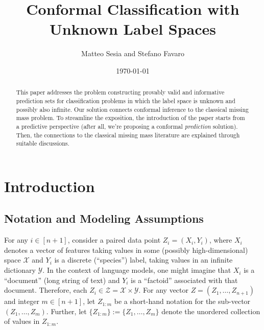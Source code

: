 \documentclass[11pt]{article}
\title{Conformal Classification with Unknown Label Spaces}
\author{Matteo Sesia and Stefano Favaro}
\date{\today}
\begin{document}
\maketitle

\begin{abstract}
  This paper addresses the problem constructing provably valid and informative prediction sets for classification problems in which the label space is unknown and possibly also infinite. Our solution connects conformal inference to the classical missing mass problem. To streamline the exposition, the introduction of the paper starts from a predictive perspective (after all, we're proposing a conformal {\em prediction} solution). Then, the connections to the classical missing mass literature are explained through suitable discussions.
\end{abstract}

\section{Introduction}

\subsection{Notation and Modeling Assumptions}

For any $i \in [n+1]$, consider a paired data point $Z_i=(X_i, Y_i)$, where $X_i$ denotes a vector of features taking values in some (possibly high-dimensional) space $\mathcal{X}$ and $Y_i$ is a discrete (``species'') label, taking values in an infinite dictionary $\mathcal{Y}$. 
In the context of language models, one might imagine that $X_i$ is a ``document'' (long string of text) and $Y_i$ is a ``factoid'' associated with that document.
Therefore, each $Z_i \in \mathcal{Z} = \mathcal{X} \times \mathcal{Y}$.
For any vector $Z=(Z_1,\ldots,Z_{n+1})$ and integer $m \in [n+1]$, let $Z_{1:m}$ be a short-hand notation for the sub-vector $(Z_1,\ldots,Z_m)$.
Further, let $\{Z_{1:m}\} := \{Z_1,\ldots,Z_m\}$ denote the unordered collection of values in $Z_{1:m}$.
\end{document}
